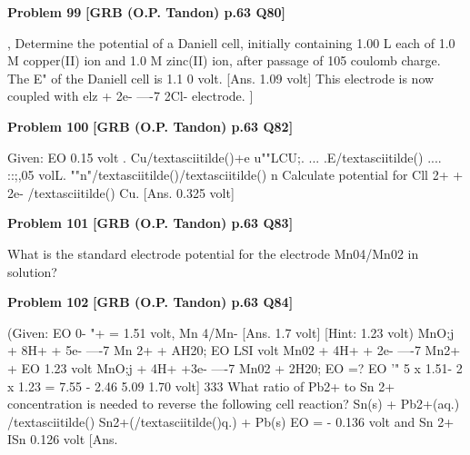 \begin{problembox}
\textbf{Problem 99} \hfill \textbf{[GRB (O.P. Tandon) p.63 Q80]}
\label{q:ext-grb_all_questions-99}

, Determine the potential of a Daniell cell, initially containing 
1.00 L each of 1.0 M copper(II) ion and 1.0 M zinc(II) ion, 
after passage of 105 coulomb charge. The E" of the Daniell 
cell is 1.1 0 volt. 
[Ans. 
1.09 volt] 
This electrode is now coupled with elz + 2e- ----7 2Cl-
electrode. ]
\end{problembox}

\begin{problembox}
\textbf{Problem 100} \hfill \textbf{[GRB (O.P. Tandon) p.63 Q82]}
\label{q:ext-grb_all_questions-100}

Given: 
EO 
0.15 volt 
. \underline{\hspace{1cm}} Cu/textasciitilde()\underline{\hspace{1cm}}+\underline{\hspace{1cm}}e 
\underline{\hspace{1cm}} u""LCU;\underline{\hspace{1cm}}. \underline{\hspace{1cm}} 
... \underline{\hspace{1cm}}.\underline{\hspace{1cm}}E/textasciitilde() .... ::;,\underline{\hspace{1cm}}05 volL. ""n"/textasciitilde()/textasciitilde() \underline{\hspace{1cm}} 
n 
Calculate potential for Cll 2+ + 2e- /textasciitilde() 
Cu. 
[Ans. 
0.325 volt]
\end{problembox}

\begin{problembox}
\textbf{Problem 101} \hfill \textbf{[GRB (O.P. Tandon) p.63 Q83]}
\label{q:ext-grb_all_questions-101}

What is the standard electrode potential for the electrode 
Mn04/Mn02 in solution?
\end{problembox}

\begin{problembox}
\textbf{Problem 102} \hfill \textbf{[GRB (O.P. Tandon) p.63 Q84]}
\label{q:ext-grb_all_questions-102}

(Given: EO 0-
"+ = 1.51 volt, 
Mn 4/Mn-
[Ans. 
1.7 volt] 
[Hint: 
1.23 volt) 
MnO;j + 8H+ + 5e- ----7 Mn 2+ + AH20; EO 
LSI volt 
Mn02 + 4H+ + 2e- ----7 Mn2+ + 
EO 
1.23 volt 
MnO;j + 4H+ +3e- ----7 Mn02 + 2H20; EO =? 
EO '" 5 x 1.51- 2 x 1.23 = 7.55 - 2.46 
5.09 
1.70 volt] 
333 
What ratio of Pb2+ to Sn 2+ concentration is needed to reverse 
the following cell reaction? 
Sn(s) + Pb2+(aq.) /textasciitilde() 
Sn2+(/textasciitilde()q.) + Pb(s) 
EO 
= - 0.136 volt and 
Sn 2+ ISn 
0.126 volt 
[Ans.
\end{problembox}

